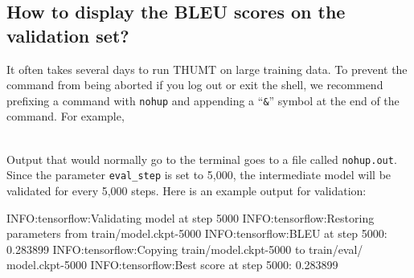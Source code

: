 \documentclass{article}
\begin{document}
\subsection{How to display the BLEU scores on the validation set?}
It often takes several days to run THUMT on large training data. To prevent the command from being aborted if you log out or exit the shell, we recommend prefixing a command with \verb|nohup| and appending a ``\verb|&|'' symbol at the end of the command. For example,
\\
\\
Output that would normally go to the terminal goes to a file called \verb|nohup.out|. Since the parameter \verb|eval_step| is set to 5,000, the intermediate model will be validated for every 5,000 steps. Here is an example output for validation:
\\
\begin{everbatim}
INFO:tensorflow:Validating model at step 5000
INFO:tensorflow:Restoring parameters from train/model.ckpt-5000
INFO:tensorflow:BLEU at step 5000: 0.283899
INFO:tensorflow:Copying train/model.ckpt-5000 to train/eval/
model.ckpt-5000
INFO:tensorflow:Best score at step 5000: 0.283899
\end{everbatim}
\\
\end{document}
